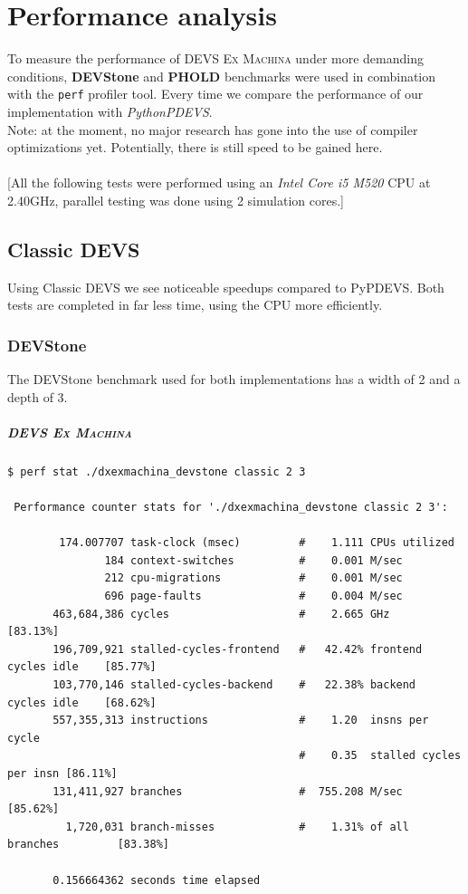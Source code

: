 \documentclass[8pt,a4paper]{report}
\begin{document}
\chapter{Performance analysis}
To measure the performance of \textsc{DEVS Ex Machina} under more demanding conditions, \textbf{DEVStone} and \textbf{PHOLD} benchmarks were used in combination with the \texttt{perf} profiler tool. Every time we compare the performance of our implementation with \textit{PythonPDEVS}.\\
Note: at the moment, no major research has gone into the use of compiler optimizations yet. Potentially, there is still speed to be gained here.\\
\\
{\footnotesize[All the following tests were performed using an \textit{Intel Core i5 M520} CPU at 2.40GHz, parallel testing was done using 2 simulation cores.]}


\section{Classic DEVS}
Using Classic DEVS we see noticeable speedups compared to PyPDEVS. Both tests are completed in far less time, using the CPU more efficiently.

\subsection{DEVStone}
The DEVStone benchmark used for both implementations has a width of 2 and a depth of 3.
\paragraph{\textsc{DEVS Ex Machina}}
\begin{Verbatim}[fontsize=\small]
$ perf stat ./dxexmachina_devstone classic 2 3

 Performance counter stats for './dxexmachina_devstone classic 2 3':

        174.007707 task-clock (msec)         #    1.111 CPUs utilized          
               184 context-switches          #    0.001 M/sec                  
               212 cpu-migrations            #    0.001 M/sec                  
               696 page-faults               #    0.004 M/sec                  
       463,684,386 cycles                    #    2.665 GHz                     [83.13%]
       196,709,921 stalled-cycles-frontend   #   42.42% frontend cycles idle    [85.77%]
       103,770,146 stalled-cycles-backend    #   22.38% backend  cycles idle    [68.62%]
       557,355,313 instructions              #    1.20  insns per cycle        
                                             #    0.35  stalled cycles per insn [86.11%]
       131,411,927 branches                  #  755.208 M/sec                   [85.62%]
         1,720,031 branch-misses             #    1.31% of all branches         [83.38%]

       0.156664362 seconds time elapsed
\end{Verbatim}
\end{document}
